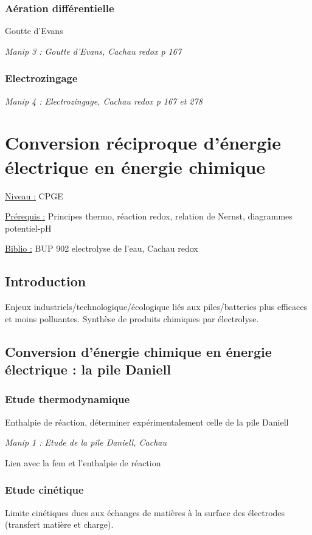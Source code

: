 \documentclass{article}%
\begin{document}
\subsubsection{Aération différentielle}
Goutte d'Evans

\textit{Manip 3 : Goutte d'Evans, Cachau redox p 167}
\subsubsection{Electrozingage}

\textit{Manip 4 : Electrozingage, Cachau redox p 167 et 278}

\section{Conversion réciproque d'énergie électrique en énergie chimique}
\underline{Niveau :} CPGE 

\underline{Prérequis :} Principes thermo, réaction redox, relation de Nernst, diagrammes potentiel-pH

\underline{Biblio :} BUP 902 electrolyse de l'eau, Cachau redox

\subsection{Introduction}

Enjeux industriels/technologique/écologique liés aux piles/batteries plus efficaces et moins polluantes. Synthèse de produits chimiques par électrolyse.

\subsection{Conversion d'énergie chimique en énergie électrique : la pile Daniell}
\subsubsection{Etude thermodynamique}
Enthalpie de réaction, déterminer expérimentalement celle de la pile Daniell

\textit{Manip 1 : Etude de la pile Daniell, Cachau}

Lien avec la fem et l'enthalpie de réaction
\subsubsection{Etude cinétique}

Limite cinétiques dues aux échanges de matières à la surface des électrodes (transfert matière et charge).
\end{document}
